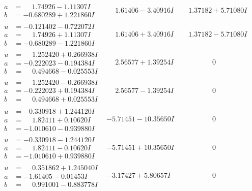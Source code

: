 \documentclass[1p]{elsarticle_modified}
\theoremstyle{definition}
\begin{document}
$$\begin{array}{c|c|c}
\begin{aligned}
a &= \phantom{-}1.74926 - 1.11307 I \\
b &= -0.680289 + 1.221860 I\end{aligned}
 & \phantom{-}1.61406 - 3.40916 I & \phantom{-}1.37182 + 5.71080 I \\ \hline\begin{aligned}
u &= -0.121402 - 0.722072 I \\
a &= \phantom{-}1.74926 + 1.11307 I \\
b &= -0.680289 - 1.221860 I\end{aligned}
 & \phantom{-}1.61406 + 3.40916 I & \phantom{-}1.37182 - 5.71080 I \\ \hline\begin{aligned}
u &= \phantom{-}1.252420 + 0.266938 I \\
a &= -0.222023 - 0.194384 I \\
b &= \phantom{-}0.494668 - 0.025553 I\end{aligned}
 & \phantom{-}2.56577 + 1.39254 I & \phantom{-0.000000 } 0 \\ \hline\begin{aligned}
u &= \phantom{-}1.252420 - 0.266938 I \\
a &= -0.222023 + 0.194384 I \\
b &= \phantom{-}0.494668 + 0.025553 I\end{aligned}
 & \phantom{-}2.56577 - 1.39254 I & \phantom{-0.000000 } 0 \\ \hline\begin{aligned}
u &= -0.330918 + 1.244120 I \\
a &= \phantom{-}1.82411 + 0.10620 I \\
b &= -1.010610 - 0.939880 I\end{aligned}
 & -5.71451 - 10.35650 I & \phantom{-0.000000 } 0 \\ \hline\begin{aligned}
u &= -0.330918 - 1.244120 I \\
a &= \phantom{-}1.82411 - 0.10620 I \\
b &= -1.010610 + 0.939880 I\end{aligned}
 & -5.71451 + 10.35650 I & \phantom{-0.000000 } 0 \\ \hline\begin{aligned}
u &= \phantom{-}0.351862 + 1.245040 I \\
a &= -1.61405 - 0.01453 I \\
b &= \phantom{-}0.991001 - 0.883778 I\end{aligned}
 & -3.17427 + 5.80657 I & \phantom{-0.000000 } 0 \\ \hline\begin{aligned}

\end{aligned}
\end{array}$$
\end{document}
